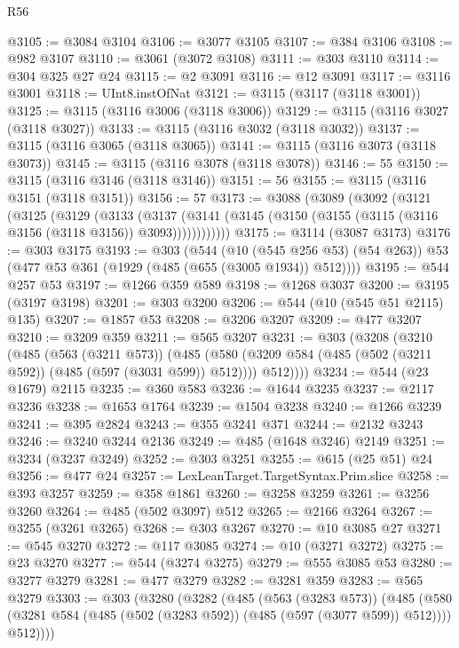 \begin{lexlean}{R56}
\begin{coremodule}
@3105 := @3084 @3104
@3106 := @3077 @3105
@3107 := @384 @3106
@3108 := @982 @3107
@3110 := @3061 (@3072 @3108)
@3111 := @303 @3110
@3114 := @304 @325 @27 @24
@3115 := @2 @3091
@3116 := @12 @3091
@3117 := @3116 @3001
@3118 := UInt8.instOfNat
@3121 := @3115 (@3117 (@3118 @3001))
@3125 := @3115 (@3116 @3006 (@3118 @3006))
@3129 := @3115 (@3116 @3027 (@3118 @3027))
@3133 := @3115 (@3116 @3032 (@3118 @3032))
@3137 := @3115 (@3116 @3065 (@3118 @3065))
@3141 := @3115 (@3116 @3073 (@3118 @3073))
@3145 := @3115 (@3116 @3078 (@3118 @3078))
@3146 := 55
@3150 := @3115 (@3116 @3146 (@3118 @3146))
@3151 := 56
@3155 := @3115 (@3116 @3151 (@3118 @3151))
@3156 := 57
@3173 := @3088
    (@3089
      (@3092
        (@3121
          (@3125
            (@3129
              (@3133
                (@3137
                  (@3141 (@3145 (@3150 (@3155 (@3115 (@3116 @3156 (@3118 @3156)) @3093))))))))))))
@3175 := @3114 (@3087 @3173)
@3176 := @303 @3175
@3193 := @303
    (@544
      (@10 (@545 @256 @53) (@54 @263))
      @53
      (@477 @53 @361 (@1929 (@485 (@655 (@3005 @1934)) @512))))
@3195 := @544 @257 @53
@3197 := @1266 @359 @589
@3198 := @1268 @3037
@3200 := @3195 (@3197 @3198)
@3201 := @303 @3200
@3206 := @544 (@10 (@545 @51 @2115) @135)
@3207 := @1857 @53
@3208 := @3206 @3207
@3209 := @477 @3207
@3210 := @3209 @359
@3211 := @565 @3207
@3231 := @303
    (@3208
      (@3210
        (@485
          (@563 (@3211 @573))
          (@485
            (@580 (@3209 @584 (@485 (@502 (@3211 @592)) (@485 (@597 (@3031 @599)) @512))))
            @512))))
@3234 := @544 (@23 @1679) @2115
@3235 := @360 @583
@3236 := @1644 @3235
@3237 := @2117 @3236
@3238 := @1653 @1764
@3239 := @1504 @3238
@3240 := @1266 @3239
@3241 := @395 @2824
@3243 := @355 @3241 @371
@3244 := @2132 @3243
@3246 := @3240 @3244 @2136
@3249 := @485 (@1648 @3246) @2149
@3251 := @3234 (@3237 @3249)
@3252 := @303 @3251
@3255 := @615 (@25 @51) @24
@3256 := @477 @24
@3257 := LexLeanTarget.TargetSyntax.Prim.slice
@3258 := @393 @3257
@3259 := @358 @1861
@3260 := @3258 @3259
@3261 := @3256 @3260
@3264 := @485 (@502 @3097) @512
@3265 := @2166 @3264
@3267 := @3255 (@3261 @3265)
@3268 := @303 @3267
@3270 := @10 @3085 @27
@3271 := @545 @3270
@3272 := @117 @3085
@3274 := @10 (@3271 @3272)
@3275 := @23 @3270
@3277 := @544 (@3274 @3275)
@3279 := @555 @3085 @53
@3280 := @3277 @3279
@3281 := @477 @3279
@3282 := @3281 @359
@3283 := @565 @3279
@3303 := @303
    (@3280
      (@3282
        (@485
          (@563 (@3283 @573))
          (@485
            (@580 (@3281 @584 (@485 (@502 (@3283 @592)) (@485 (@597 (@3077 @599)) @512))))
            @512))))

\end{coremodule}
\end{lexlean}
